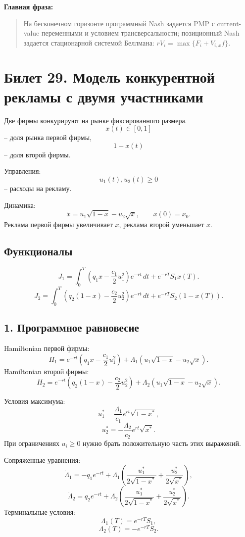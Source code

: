 \documentclass[12pt,a4paper]{article}
\begin{document}
\textbf{Главная фраза:}
\begin{quote}
На бесконечном горизонте программный Nash задается PMP с current-value переменными и условием трансверсальности; позиционный Nash задается стационарной системой Беллмана: $rV_i=\max\{F_i+V_{i,x}f\}$.
\end{quote}

\newpage
\section{Билет 29. Модель конкурентной рекламы с двумя участниками}

Две фирмы конкурируют на рынке фиксированного размера.
\[
 x(t)\in[0,1]
\]
-- доля рынка первой фирмы,
\[
 1-x(t)
\]
-- доля второй фирмы.

Управления:
\[
 u_1(t),u_2(t)\ge0
\]
-- расходы на рекламу.

Динамика:
\[
 \dot x=u_1\sqrt{1-x}-u_2\sqrt{x},\qquad x(0)=x_0.
\]
Реклама первой фирмы увеличивает $x$, реклама второй уменьшает $x$.

\subsection*{Функционалы}

\[
 J_1=\int_0^T\left(q_1x-\frac{c_1}{2}u_1^2\right)e^{-rt}\,dt+e^{-rT}S_1x(T).
\]
\[
 J_2=\int_0^T\left(q_2(1-x)-\frac{c_2}{2}u_2^2\right)e^{-rt}\,dt+e^{-rT}S_2(1-x(T)).
\]

\subsection*{1. Программное равновесие}

Hamiltonian первой фирмы:
\[
 H_1=e^{-rt}\left(q_1x-\frac{c_1}{2}u_1^2\right)+\Lambda_1(u_1\sqrt{1-x}-u_2\sqrt{x}).
\]
Hamiltonian второй фирмы:
\[
 H_2=e^{-rt}\left(q_2(1-x)-\frac{c_2}{2}u_2^2\right)+\Lambda_2(u_1\sqrt{1-x}-u_2\sqrt{x}).
\]

Условия максимума:
\[
 u_1^*=\frac{\Lambda_1}{c_1}e^{rt}\sqrt{1-x^*},
\]
\[
 u_2^*=-\frac{\Lambda_2}{c_2}e^{rt}\sqrt{x^*}.
\]
При ограничениях $u_i\ge0$ нужно брать положительную часть этих выражений.

Сопряженные уравнения:
\[
 \dot\Lambda_1=-q_1e^{-rt}+\Lambda_1\left(\frac{u_1^*}{2\sqrt{1-x^*}}+\frac{u_2^*}{2\sqrt{x^*}}\right),
\]
\[
 \dot\Lambda_2=q_2e^{-rt}+\Lambda_2\left(\frac{u_1^*}{2\sqrt{1-x^*}}+\frac{u_2^*}{2\sqrt{x^*}}\right).
\]
Терминальные условия:
\[
 \Lambda_1(T)=e^{-rT}S_1,
\]
\[
 \Lambda_2(T)=-e^{-rT}S_2.
\]
\end{document}
